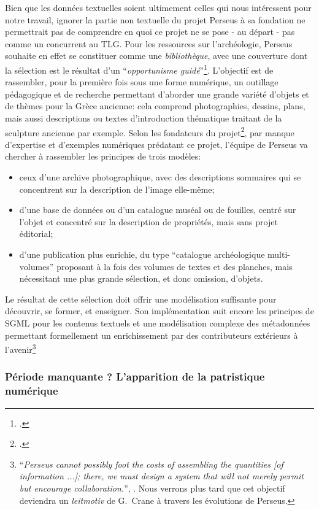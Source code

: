 Bien que les données textuelles soient ultimement celles qui nous intéressent pour notre travail, ignorer la partie non textuelle du projet Perseus à sa fondation ne permettrait pas de comprendre en quoi ce projet ne se pose - au départ - pas comme un concurrent au TLG. Pour les ressources sur l'archéologie, Perseus souhaite en effet se constituer comme une \textit{bibliothèque}, avec une couverture dont la sélection est le résultat d'un \enquote{\textit{opportunisme guidé}}\footcite[p. 145]{mylonas_perseus_1993}. L'objectif est de rassembler, pour la première fois sous une forme numérique, un outillage pédagogique et de recherche permettant d'aborder une grande variété d'objets et de thèmes pour la Grèce ancienne: cela comprend photographies, dessins, plans, mais aussi descriptions ou textes d'introduction thématique traitant de la sculpture ancienne par exemple. Selon les fondateurs du projet\footcite[p. 143]{mylonas_perseus_1993}, par manque d'expertise et d'exemples numériques prédatant ce projet, l'équipe de Perseus va chercher à rassembler les principes de trois modèles:
\begin{itemize}
    \item ceux d'une archive photographique, avec des descriptions sommaires qui se concentrent sur la description de l'image elle-même;
    \item d'une base de données ou d'un catalogue muséal ou de fouilles, centré sur l'objet et concentré sur la description de propriétés, mais sans projet éditorial;
    \item d'une publication plus enrichie, du type \enquote{catalogue archéologique multi-volumes}  proposant à la fois des volumes de textes et des planches, mais nécessitant une plus grande sélection, et donc omission, d'objets.
\end{itemize}
Le résultat de cette sélection doit offrir une modélisation suffisante pour découvrir, se former, et enseigner. Son implémentation suit encore les principes de SGML pour les contenus textuels et une modélisation complexe des métadonnées permettant formellement un enrichissement par des contributeurs extérieurs à l'avenir\footnote{\enquote{\textit{Perseus cannot possibly foot the costs of assembling the quantities {[of information ...]}; there, we must design a system that will not merely permit but encourage collaboration.}}, \cite[p. 148]{mylonas_perseus_1993}. Nous verrons plus tard que cet objectif deviendra un \textit{leitmotiv} de G.~Crane à travers les évolutions de Perseus.}

\subsubsection{Période manquante ? L'apparition de la patristique numérique}

